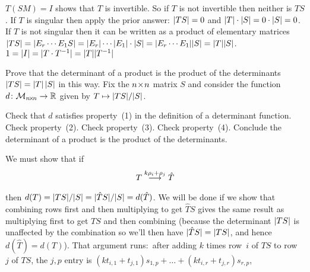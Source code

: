 \begin{exercises}
\begin{answer}
\begin{exparts}
          \( T(SM)=I \) shows that \( T \) is invertible.
          So if \( T \) is not invertible then neither is \( TS \).
        \partsitem If \( T \) is singular then apply the prior answer:
          \( \deter{TS}=0 \) and
          \( \deter{T}\cdot\deter{S}=0\cdot\deter{S}=0 \).
          If \( T \) is not singular then it can be written as a product of
          elementary matrices
          $
            \deter{TS}=\deter{E_r\cdots E_1S}=
            \deter{E_r}\cdots\deter{E_1}\cdot\deter{S}=
            \deter{E_r\cdots E_1}\deter{S}=\deter{T}\deter{S}
          $.
        \partsitem \( 1=\deter{I}=\deter{T\cdot T^{-1}}
                     =\deter{T}\deter{T^{-1}} \)
      \end{exparts}  
     \end{answer} 
  \item 
    Prove that the determinant of a product is the product of the
    determinants \( \deter{TS}=\deter{T}\,\deter{S} \) in this way.
    Fix the \( n \! \times \! n \) matrix \( S \) and consider the function
    \( \mbox{$d\colon \mathcal{M}_{n \! \times \! n}\to \mathbb{R}$} \) given by
    \( T\mapsto \deter{TS}/\deter{S} \).
    \begin{exparts}
      \partsitem Check that \( d \) satisfies property~(1) in the definition of
        a determinant function.
      \partsitem Check property~(2).
      \partsitem Check property~(3).
      \partsitem Check property~(4).
      \partsitem Conclude the determinant of a product is the product of the
        determinants.
    \end{exparts}
    \begin{answer}
      \begin{exparts}
        \partsitem We must show that if
          \begin{equation*}
            T\mathrel{ \mathop{\longrightarrow}\limits^{k\rho_i+\rho_j\mathstrut}_{ \begin{subarray}{l} \relax \end{subarray}}}\hat{T}
          \end{equation*}
          then $d(T)=\deter{TS}/\deter{S}
          =\deter{\hat{T}S}/\deter{S}=d(\hat{T})$.
          We will be done if we show that combining rows first and
          then multiplying to get \( \hat{T}S \) gives the same result as
          multiplying first to get \( TS \) and then combining
          (because the determinant \( \deter{TS} \) is unaffected by the
          combination so we'll then have \( \deter{\hat{T}S}=\deter{TS} \), and
          hence \( d(\hat{T})=d(T) \)).
          That argument runs:~after adding 
          \( k \) times row~\( i \) of \( TS \) to
          row~$j$ of \( TS \), the \( j,p \) entry is
          \( (kt_{i,1}+t_{j,1})s_{1,p}+\dots+(kt_{i,r}+t_{j,r})s_{r,p} \),

\end{exparts}
\end{answer}
\end{exercises}

